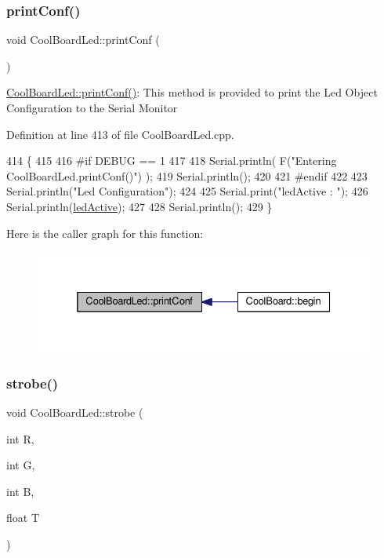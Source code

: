 \subsubsection{\texorpdfstring{print\+Conf()}{printConf()}}
{\footnotesize\ttfamily void Cool\+Board\+Led\+::print\+Conf (\begin{DoxyParamCaption}{ }\end{DoxyParamCaption})}

\hyperlink{class_cool_board_led_a8ed3053a36f0ed4a131f43b5b17efb61}{Cool\+Board\+Led\+::print\+Conf()}\+: This method is provided to print the Led Object Configuration to the Serial Monitor 

Definition at line 413 of file Cool\+Board\+Led.\+cpp.


\begin{DoxyCode}
414 \{
415 
416 \textcolor{preprocessor}{#if DEBUG == 1 }
417 
418     Serial.println( F(\textcolor{stringliteral}{"Entering CoolBoardLed.printConf()"}) );
419     Serial.println();
420 
421 \textcolor{preprocessor}{#endif}
422 
423     Serial.println(\textcolor{stringliteral}{"Led Configuration"});
424 
425     Serial.print(\textcolor{stringliteral}{"ledActive : "});
426     Serial.println(\hyperlink{class_cool_board_led_aadd04d2ecf123247718d77f42fba7f08}{ledActive});
427 
428     Serial.println();   
429 \}
\end{DoxyCode}
Here is the caller graph for this function\+:\nopagebreak
\begin{figure}[H]
\begin{center}
\leavevmode
\includegraphics[width=332pt]{de/dc0/class_cool_board_led_a8ed3053a36f0ed4a131f43b5b17efb61_icgraph}
\end{center}
\end{figure}
\mbox{\label{class_cool_board_led_ad5f0de4c628cbfbf49896042831c64ad}} 
\subsubsection{\texorpdfstring{strobe()}{strobe()}}
{\footnotesize\ttfamily void Cool\+Board\+Led\+::strobe (\begin{DoxyParamCaption}\item[{int}]{R,  }\item[{int}]{G,  }\item[{int}]{B,  }\item[{float}]{T }\end{DoxyParamCaption})}

